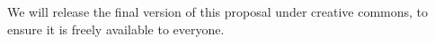 We will release the final version of this proposal under creative commons,
to ensure it is freely available to everyone.
